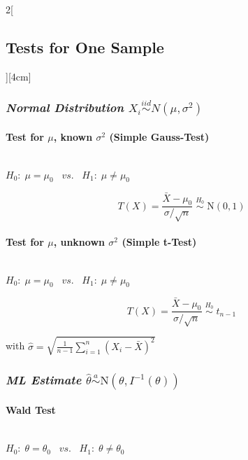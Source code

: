 \documentclass[8pt]{extarticle}
\begin{document}
\begin{multicols}{2}[\subsection{Tests for One Sample}][4cm]

\subsubsection*{\textit{Normal Distribution $X_i \overset{iid}{\sim} N(\mu,\sigma^2)$}}

  \paragraph{Test for $\mu$, known $\sigma^2 $ (Simple Gauss-Test)} \ \\
  
  \noindent $H_0\!:\; \mu = \mu_0 \;\;\; vs. \;\;\; H_1\!:\; \mu \neq \mu_0$
  
  $$T(X) = \frac{\bar{X} -\mu_0}{\sigma/\sqrt{n}} \;\overset{H_0}{\sim} \;\mathrm{N}(0,1)$$
  
  
  
  \paragraph{Test for $\mu$, unknown $\sigma^2 $ (Simple t-Test)} \ \\
  
  \noindent $H_0\!:\; \mu = \mu_0 \;\;\; vs. \;\;\; H_1\!:\; \mu \neq \mu_0$
  
  $$T(X) = \frac{\bar{X} -\mu_0}{\hat{\sigma}/\sqrt{n}} \;\overset{H_0}{\sim}\; t_{n-1}$$
  
  \noindent with $\hat{\sigma} = \sqrt{\frac{1}{n-1} \sum_{i=1}^n(X_i - \bar{X})^2}$
  
\subsubsection*{\textit{ML Estimate $\hat{\theta} \overset{a}{\sim} \mathrm{N}(\theta, I^{-1}(\theta))$}}
  
  \paragraph{Wald Test} \ \\
  
  \noindent $H_0\!:\; \theta = \theta_0 \;\;\; vs. \;\;\; H_1\!:\; \theta \neq \theta_0$
  

\end{multicols}
\end{document}
